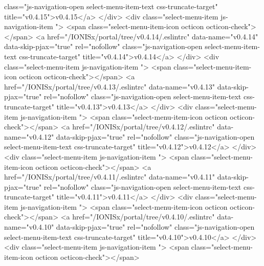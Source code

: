                  class="js-navigation-open select-menu-item-text css-truncate-target"
                 title="v0.4.15">v0.4.15</a>
            </div>
            <div class="select-menu-item js-navigation-item ">
              <span class="select-menu-item-icon octicon octicon-check"></span>
              <a href="/IONISx/portal/tree/v0.4.14/.eslintrc"
                 data-name="v0.4.14"
                 data-skip-pjax="true"
                 rel="nofollow"
                 class="js-navigation-open select-menu-item-text css-truncate-target"
                 title="v0.4.14">v0.4.14</a>
            </div>
            <div class="select-menu-item js-navigation-item ">
              <span class="select-menu-item-icon octicon octicon-check"></span>
              <a href="/IONISx/portal/tree/v0.4.13/.eslintrc"
                 data-name="v0.4.13"
                 data-skip-pjax="true"
                 rel="nofollow"
                 class="js-navigation-open select-menu-item-text css-truncate-target"
                 title="v0.4.13">v0.4.13</a>
            </div>
            <div class="select-menu-item js-navigation-item ">
              <span class="select-menu-item-icon octicon octicon-check"></span>
              <a href="/IONISx/portal/tree/v0.4.12/.eslintrc"
                 data-name="v0.4.12"
                 data-skip-pjax="true"
                 rel="nofollow"
                 class="js-navigation-open select-menu-item-text css-truncate-target"
                 title="v0.4.12">v0.4.12</a>
            </div>
            <div class="select-menu-item js-navigation-item ">
              <span class="select-menu-item-icon octicon octicon-check"></span>
              <a href="/IONISx/portal/tree/v0.4.11/.eslintrc"
                 data-name="v0.4.11"
                 data-skip-pjax="true"
                 rel="nofollow"
                 class="js-navigation-open select-menu-item-text css-truncate-target"
                 title="v0.4.11">v0.4.11</a>
            </div>
            <div class="select-menu-item js-navigation-item ">
              <span class="select-menu-item-icon octicon octicon-check"></span>
              <a href="/IONISx/portal/tree/v0.4.10/.eslintrc"
                 data-name="v0.4.10"
                 data-skip-pjax="true"
                 rel="nofollow"
                 class="js-navigation-open select-menu-item-text css-truncate-target"
                 title="v0.4.10">v0.4.10</a>
            </div>
            <div class="select-menu-item js-navigation-item ">
              <span class="select-menu-item-icon octicon octicon-check"></span>
